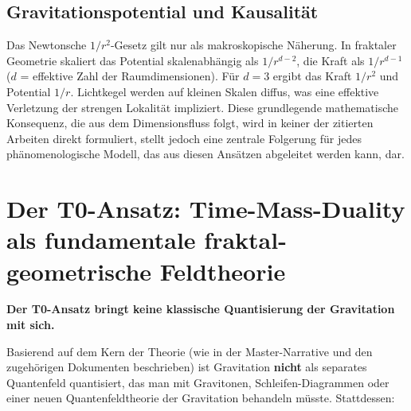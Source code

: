 	\subsection{Gravitationspotential und Kausalität}
	Das Newtonsche $1/r^2$-Gesetz gilt nur als makroskopische Näherung. In fraktaler Geometrie skaliert das Potential skalenabhängig als $1/r^{d-2}$, die Kraft als $1/r^{d-1}$ ($d$ = effektive Zahl der Raumdimensionen). Für $d = 3$ ergibt das Kraft $1/r^2$ und Potential $1/r$. Lichtkegel werden auf kleinen Skalen diffus, was eine effektive Verletzung der strengen Lokalität impliziert. Diese grundlegende mathematische Konsequenz, die aus dem Dimensionsfluss folgt, wird in keiner der zitierten Arbeiten direkt formuliert, stellt jedoch eine zentrale Folgerung für jedes phänomenologische Modell, das aus diesen Ansätzen abgeleitet werden kann, dar.
	
	\section{Der T0-Ansatz: Time-Mass-Duality als fundamentale fraktal-geometrische Feldtheorie}
	
	\textbf{Der T0-Ansatz bringt keine klassische Quantisierung der Gravitation mit sich.}
	
	Basierend auf dem Kern der Theorie (wie in der Master-Narrative und den zugehörigen Dokumenten beschrieben) ist Gravitation \textbf{nicht} als separates Quantenfeld quantisiert, das man mit Gravitonen, Schleifen-Diagrammen oder einer neuen Quantenfeldtheorie der Gravitation behandeln müsste. Stattdessen:
	
